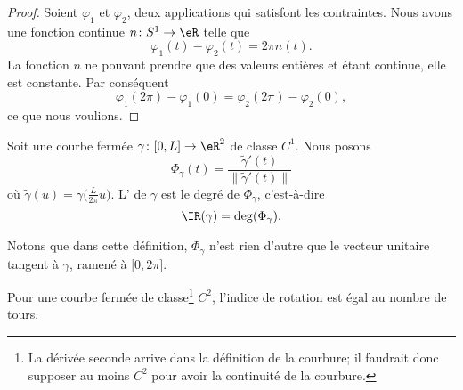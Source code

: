 \begin{proof}
	Soient \( \varphi_1\) et \( \varphi_2\), deux applications qui satisfont les contraintes. Nous avons une fonction continue \( n\colon S^1\to \eR\) telle que
	\begin{equation}
		\varphi_1(t)-\varphi_2(t)=2\pi n(t).
	\end{equation}
	La fonction \( n\) ne pouvant prendre que des valeurs entières et étant continue, elle est constante. Par conséquent
	\begin{equation}
		\varphi_1(2\pi)-\varphi_1(0)=\varphi_2(2\pi)-\varphi_2(0),
	\end{equation}
	ce que nous voulions.
\end{proof}

\begin{definition}      \label{DEFooOCUQooUAlbLo}
	Soit une courbe fermée \( \gamma\colon \mathopen[ 0 , L \mathclose]\to \eR^2\) de classe \( C^1\). Nous posons
	\begin{equation}
		\Phi_{\gamma}(t)=\frac{ \tilde \gamma'(t) }{ \| \tilde \gamma'(t) \| }
	\end{equation}
	où \( \tilde \gamma(u)=\gamma\big( \frac{ L }{ 2\pi }u \big)\). L' de \( \gamma\) est le degré de \( \Phi_{\gamma}\), c'est-à-dire
	\begin{equation}
		\IR(\gamma)=\deg(\Phi_{\gamma}).
	\end{equation}
\end{definition}
Notons que dans cette définition, \( \Phi_{\gamma}\) n'est rien d'autre que le vecteur unitaire tangent à \( \gamma\), ramené à \( \mathopen[ 0 , 2\pi \mathclose]\).

\begin{proposition}     \label{PROPooXHSDooDDnlJQ}
	Pour une courbe fermée de classe\footnote{La dérivée seconde arrive dans la définition de la courbure; il faudrait donc supposer au moins \( C^2\) pour avoir la continuité de la courbure.} \( C^{2}\), l'indice de rotation est égal au nombre de tours.
\end{proposition}

